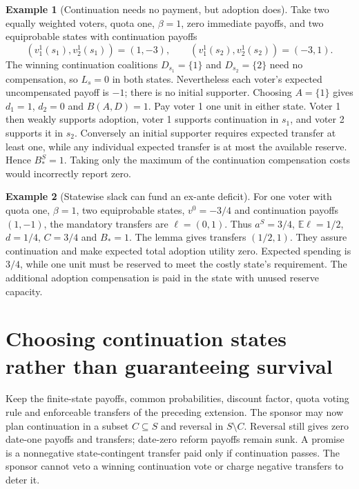 \documentclass[11pt]{article}
\theoremstyle{definition}
\newtheorem{example}{Example}
\begin{document}
\begin{example}[Continuation needs no payment, but adoption does]
Take two equally weighted voters, quota one, $\beta=1$, zero immediate
payoffs, and two equiprobable states with continuation payoffs
\[
 (v_1^1(s_1),v_2^1(s_1))=(1,-3),\qquad
 (v_1^1(s_2),v_2^1(s_2))=(-3,1).
\]
The winning continuation coalitions $D_{s_1}=\{1\}$ and
$D_{s_2}=\{2\}$ need no compensation, so $L_s=0$ in both states.
Nevertheless each voter's expected uncompensated payoff is $-1$;
there is no initial supporter. Choosing $A=\{1\}$ gives $d_1=1$,
$d_2=0$ and $B(A,D)=1$. Pay voter 1 one unit in either state.
Voter 1 then weakly supports adoption, voter 1 supports continuation
in $s_1$, and voter 2 supports it in $s_2$. Conversely an initial
supporter requires expected transfer at least one, while any individual
expected transfer is at most the available reserve. Hence $B_*^S=1$.
Taking only the maximum of the continuation compensation costs would
incorrectly report zero.
\end{example}

\begin{example}[Statewise slack can fund an ex-ante deficit]
For one voter with quota one, $\beta=1$, two equiprobable states,
$v^0=-3/4$ and continuation payoffs $(1,-1)$, the mandatory transfers
are $\ell=(0,1)$. Thus $a^S=3/4$, $\mathbb E\ell=1/2$,
$d=1/4$, $C=3/4$ and $B_*=1$. The lemma gives transfers $(1/2,1)$.
They assure continuation and make expected total adoption utility zero.
Expected spending is $3/4$, while one unit must be reserved to meet
the costly state's requirement. The additional adoption compensation
is paid in the state with unused reserve capacity.
\end{example}


\section*{Choosing continuation states rather than guaranteeing survival}
Keep the finite-state payoffs, common probabilities, discount factor,
quota voting rule and enforceable transfers of the preceding extension.
The sponsor may now plan continuation in a subset $C\subseteq S$ and
reversal in $S\setminus C$. Reversal still gives zero date-one payoffs
and transfers; date-zero reform payoffs remain sunk. A promise is a
nonnegative state-contingent transfer paid only if continuation passes.
The sponsor cannot veto a winning continuation vote or charge negative
transfers to deter it.
\end{document}
